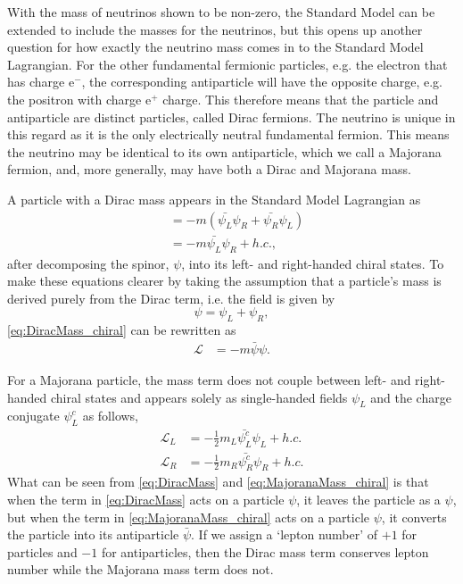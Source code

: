 With the mass of neutrinos shown to be non-zero, the Standard Model can be extended to include the masses for the neutrinos, but this opens up another question for how exactly the neutrino mass comes in to the Standard Model Lagrangian. For the other fundamental fermionic particles, e.g. the electron that has charge $\textrm{e}^-$, the corresponding antiparticle will have the opposite charge, e.g. the positron with charge $\textrm{e}^+$ charge. This therefore means that the particle and antiparticle are distinct particles, called Dirac fermions. The neutrino is unique in this regard as it is the only electrically neutral fundamental fermion. This means the neutrino may be identical to its own antiparticle, which we call a Majorana fermion, and, more generally, may have both a Dirac and Majorana mass.

A particle with a Dirac mass appears in the Standard Model Lagrangian as
\begin{align}
&= -m(\bar{\psi_L}\psi_R + \bar{\psi_R}\psi_L) \\
&= -m\bar{\psi_L}\psi_R + h.c.,
\label{eq:DiracMass_chiral}
\end{align}
after decomposing the spinor, $\psi$, into its left- and right-handed chiral states. To make these equations clearer by taking the assumption that a particle's mass is derived purely from the Dirac term, i.e. the field is given by
\begin{equation}
\psi = \psi_L + \psi_R,
\end{equation}
\autoref{eq:DiracMass_chiral} can be rewritten as
\begin{align}
\mathcal{L} &= -m\bar{\psi}\psi. \label{eq:DiracMass}
\end{align}

For a Majorana particle, the mass term does not couple between left- and right-handed chiral states and appears solely as single-handed fields $\psi_L$ and the charge conjugate $\psi_L^c$ as follows,
\begin{align}
\mathcal{L}_L &= -\frac{1}{2}m_L\bar{\psi^c_L}\psi_L+h.c. \label{eq:MajoranaMass_chiral} \\
\mathcal{L}_R &= -\frac{1}{2}m_R\bar{\psi^c_R}\psi_R+h.c.
\end{align}
What can be seen from \autoref{eq:DiracMass} and \autoref{eq:MajoranaMass_chiral} is that when the term in \autoref{eq:DiracMass} acts on a particle $\psi$, it leaves the particle as a $\psi$, but when the term in \autoref{eq:MajoranaMass_chiral} acts on a particle $\psi$, it converts the particle into its antiparticle $\bar{\psi}$. If we assign a `lepton number' of $+1$ for particles and $-1$ for antiparticles, then the Dirac mass term conserves lepton number while the Majorana mass term does not.

